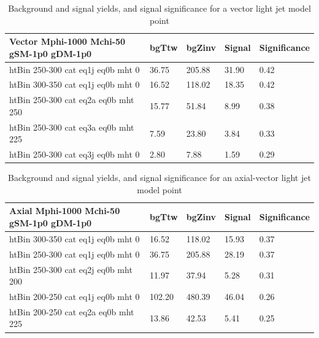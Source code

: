 \begin{table}
\small
\begin{center}
\caption{Background and signal yields, and signal significance for a vector light jet model point}
\label{tab:MSB_V_g1_2fb}
\begin{tabular}{|l|l|l|l|l|}
\textbf{Vector Mphi-1000 Mchi-50 gSM-1p0 gDM-1p0}   &  bgTtw    &  bgZinv   &  Signal &
Significance \\ 
\hline
htBin 250-300 cat eq1j eq0b mht 0 &     36.75    &  205.88   &  31.90   &0.42 \\ 
htBin 300-350 cat eq1j eq0b mht 0 &     16.52    &  118.02   &  18.35   &0.42 \\ 
htBin 250-300 cat eq2a eq0b mht 250 &   15.77    &  51.84    &  8.99    &0.38 \\ 
htBin 250-300 cat eq3a eq0b mht 225 &   7.59     &  23.80    &  3.84    &0.33 \\ 
htBin 250-300 cat eq3j eq0b mht 0 &     2.80     &  7.88     &  1.59    &0.29 \\ 
\end{tabular}
\end{center}
\end{table}

\begin{table}
\small
\begin{center}
\caption{Background and signal yields, and signal significance for an axial-vector light jet model point}
\label{tab:MSB_A_g1_2fb}
\begin{tabular}{|l|l|l|l|l|}
\textbf{Axial Mphi-1000 Mchi-50 gSM-1p0 gDM-1p0}    &  bgTtw    &  bgZinv   &  Signal &
Significance \\ 
\hline
htBin 300-350 cat eq1j eq0b mht 0 &     16.52    &  118.02   &  15.93   &0.37 \\ 
htBin 250-300 cat eq1j eq0b mht 0 &     36.75    &  205.88   &  28.19   &0.37 \\ 
htBin 250-300 cat eq2j eq0b mht 200 &   11.97    &  37.94    &  5.28    &0.31 \\ 
htBin 200-250 cat eq1j eq0b mht 0 &     102.20   &  480.39   &  46.04   &0.26 \\ 
htBin 200-250 cat eq2a eq0b mht 225 &   13.86    &  42.53    &  5.41    &0.25 \\ 
\end{tabular}
\end{center}
\end{table}

\clearpage

